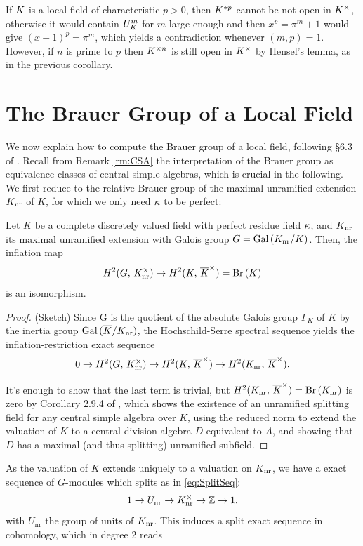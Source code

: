 \documentclass[a4paper, oneside]{memoir}
\begin{document}
\begin{remark}\label{rm:KxOpenCharP}
	If $K$ is a local field of characteristic $p>0$, then $K^{*p}$ cannot be not open in $K^\times$, otherwise it would contain $U_K^m$ for $m$ large enough and then $x^p = \pi^m + 1$ would give $(x-1)^p = \pi^m$, which yields a contradiction whenever $(m,p)=1$.
	However, if $n$ is prime to $p$ then $K^{\times n}$ is still open in $K^\times$ by Hensel's lemma, as in the previous corollary.
\end{remark}

\section{The Brauer Group of a Local Field}

We now explain how to compute the Brauer group of a local field, following \S 6.3 of \cite{GilleSzamuely}. Recall from Remark \ref{rm:CSA} the interpretation of the Brauer group as equivalence classes of central simple algebras, which is crucial in the following. We first reduce to the relative Brauer group of the maximal unramified extension $K_{\text{nr}}$ of $K$, for which we only need $\kappa$ to be perfect:

\begin{proposition}
	Let $K$ be a complete discretely valued field with perfect residue field $\kappa$, and $K_{\text{nr}}$ its maximal unramified extension with Galois group $G=\operatorname{Gal}{(K_{\text{nr}}/K)}$. Then, the inflation map
	\[
		H^{2}( G, \, K_{\text{nr}}^\times )\to H^{2}( K, \, \overline{K}^\times )= \operatorname{Br}{(K)}
	\]
	is an isomorphism.

\end{proposition}
\begin{proof}{(Sketch)}
	Since G is the quotient of the absolute Galois group $\Gamma_K$ of $K$ by the inertia group $\operatorname{Gal}{(\overline{K}/K_{\text{nr}})}$, the Hochschild-Serre spectral sequence yields the inflation-restriction exact sequence
	\[
		0\to H^{2}( G, \, K_{\text{nr}}^\times )\to H^{2}( K, \, \overline{K}^\times )\to H^{2}( K_{\text{nr}}, \, \overline{K}^\times ).
	\]

	It's enough to show that the last term is trivial, but $H^{2}( K_{\text{nr}}, \, \overline{K}^\times )=\operatorname{Br}{(K_{\text{nr}})}$ is zero by Corollary 2.9.4 of \cite{GilleSzamuely}, which shows the existence of an unramified splitting field for any central simple algebra over $K$, using the reduced norm to extend the valuation of $K$ to a central division algebra $D$ equivalent to $A$, and showing that $D$ has a maximal (and thus splitting) unramified subfield.
\end{proof}
As the valuation of $K$ extends uniquely to a valuation on $K_{\text{nr}}$, we have a exact sequence of $G$-modules which splits as in \eqref{eq:SplitSeq}:
\[
	1\to U_{\text{nr}} \to K_{\text{nr}}^\times\to\mathbb{Z}\to 1,
\]
with $U_{\text{nr}}$ the group of units of $K_{\text{nr}}$. This induces a split exact sequence in cohomology, which in degree 2 reads
\end{document}
